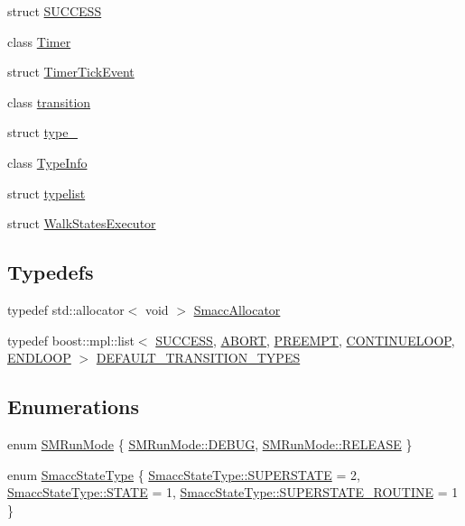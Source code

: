 \begin{DoxyCompactItemize}
\item 
struct \hyperlink{structsmacc_1_1SUCCESS}{S\+U\+C\+C\+E\+SS}
\item 
class \hyperlink{classsmacc_1_1Timer}{Timer}
\item 
struct \hyperlink{structsmacc_1_1TimerTickEvent}{Timer\+Tick\+Event}
\item 
class \hyperlink{classsmacc_1_1transition}{transition}
\item 
struct \hyperlink{structsmacc_1_1type__}{type\+\_\+}
\item 
class \hyperlink{classsmacc_1_1TypeInfo}{Type\+Info}
\item 
struct \hyperlink{structsmacc_1_1typelist}{typelist}
\item 
struct \hyperlink{structsmacc_1_1WalkStatesExecutor}{Walk\+States\+Executor}
\end{DoxyCompactItemize}
\subsection*{Typedefs}
\begin{DoxyCompactItemize}
\item 
typedef std\+::allocator$<$ void $>$ \hyperlink{namespacesmacc_ac43548af6721e408234339fcf1ab1254}{Smacc\+Allocator}
\item 
typedef boost\+::mpl\+::list$<$ \hyperlink{structsmacc_1_1SUCCESS}{S\+U\+C\+C\+E\+SS}, \hyperlink{structsmacc_1_1ABORT}{A\+B\+O\+RT}, \hyperlink{structsmacc_1_1PREEMPT}{P\+R\+E\+E\+M\+PT}, \hyperlink{structsmacc_1_1CONTINUELOOP}{C\+O\+N\+T\+I\+N\+U\+E\+L\+O\+OP}, \hyperlink{structsmacc_1_1ENDLOOP}{E\+N\+D\+L\+O\+OP} $>$ \hyperlink{namespacesmacc_a5238572f5e2747391ba919540aaf70bd}{D\+E\+F\+A\+U\+L\+T\+\_\+\+T\+R\+A\+N\+S\+I\+T\+I\+O\+N\+\_\+\+T\+Y\+P\+ES}
\end{DoxyCompactItemize}
\subsection*{Enumerations}
\begin{DoxyCompactItemize}
\item 
enum \hyperlink{namespacesmacc_a3e4f79486ea6ea6342dd3c712d16a4f6}{S\+M\+Run\+Mode} \{ \hyperlink{namespacesmacc_a3e4f79486ea6ea6342dd3c712d16a4f6adc30ec20708ef7b0f641ef78b7880a15}{S\+M\+Run\+Mode\+::\+D\+E\+B\+UG}, 
\hyperlink{namespacesmacc_a3e4f79486ea6ea6342dd3c712d16a4f6a7d649ef069df9885e382417c79f3d5cd}{S\+M\+Run\+Mode\+::\+R\+E\+L\+E\+A\+SE}
 \}
\item 
enum \hyperlink{namespacesmacc_a63f5f7aae7e563619d0886fca83612cc}{Smacc\+State\+Type} \{ \hyperlink{namespacesmacc_a63f5f7aae7e563619d0886fca83612cca4da54a31b31f1c863864fdee05fc35c8}{Smacc\+State\+Type\+::\+S\+U\+P\+E\+R\+S\+T\+A\+TE} = 2, 
\hyperlink{namespacesmacc_a63f5f7aae7e563619d0886fca83612cca2b848a8cc886d253d21a77c43cd50aae}{Smacc\+State\+Type\+::\+S\+T\+A\+TE} = 1, 
\hyperlink{namespacesmacc_a63f5f7aae7e563619d0886fca83612cca6d39c20504d2f2afe9c8c27351e61d20}{Smacc\+State\+Type\+::\+S\+U\+P\+E\+R\+S\+T\+A\+T\+E\+\_\+\+R\+O\+U\+T\+I\+NE} = 1
 \}
\end{DoxyCompactItemize}
